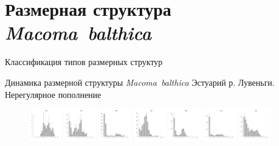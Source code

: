 \documentclass{beamer}
\begin{document}
	\section{Размерная структура {\it Macoma~balthica}}
\begin{frame}{Классификация типов размерных структур}
\end{frame}

	
\begin{frame}{Динамика размерной структуры {\it Macoma~balthica}}
Эстуарий р. Лувеньги. Нерегулярное пополнение
\begin{figure}[h]
\includegraphics[width=14mm]{../White_Sea/Estuatiy_Luvenga/sizestr2_1992_.pdf}
\includegraphics[width=14mm]{../White_Sea/Estuatiy_Luvenga/sizestr2_1995_.pdf}
\includegraphics[width=14mm]{../White_Sea/Estuatiy_Luvenga/sizestr2_1998_.pdf}
\includegraphics[width=14mm]{../White_Sea/Estuatiy_Luvenga/sizestr2_2001_.pdf}
\includegraphics[width=14mm]{../White_Sea/Estuatiy_Luvenga/sizestr2_2004_.pdf}
\includegraphics[width=14mm]{../White_Sea/Estuatiy_Luvenga/sizestr2_2007_.pdf}
\includegraphics[width=14mm]{../White_Sea/Estuatiy_Luvenga/sizestr2_2010_.pdf}

\end{figure}
\end{frame}
\end{document}
